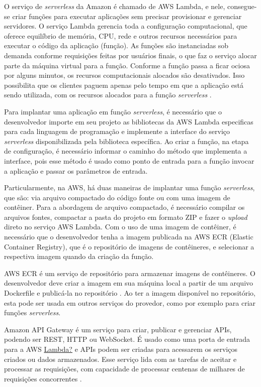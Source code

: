\documentclass[conference]{IEEEtran}
\begin{document}
O serviço de \textit{serverless} da Amazon é chamado de AWS Lambda, e nele, consegue-se criar funções para executar aplicações sem precisar provisionar e gerenciar servidores. 
O serviço Lambda gerencia toda a configuração computacional, que oferece equilíbrio de memória, CPU, rede e outros recursos necessários para executar o código da aplicação (função).
As funções são instanciadas sob demanda conforme requisições feitas por usuários finais, o que faz o serviço alocar parte da máquina virtual para a função. Conforme a função passa a ficar ociosa por alguns minutos, os recursos computacionais alocados são desativados. Isso possibilita que os clientes paguem apenas pelo tempo em que a aplicação está sendo utilizada, com os recursos alocados para a função \textit{serverless} \cite{aws_2023_what_is_lambda}.

Para implantar uma aplicação em função \textit{serverless}, é necessário que o desenvolvedor importe em seu projeto as bibliotecas da AWS Lambda especificas para cada linguagem de programação e implemente a interface do serviço \textit{serverless} disponibilizada pela biblioteca específica. Ao criar a função, na etapa de configuração, é necessário informar o caminho do método que implementa a interface, pois esse método é usado como ponto de entrada para a função invocar a aplicação e passar os parâmetros de entrada.

Particularmente, na AWS, há duas maneiras de implantar uma função \textit{serverless}, que são: via arquivo compactado do código fonte ou com uma imagem de contêiner. Para a abordagem de arquivo compactado, é necessário compilar os arquivos fontes, compactar a pasta do projeto em formato ZIP e fazer o \textit{upload} direto no serviço AWS Lambda. Com o uso de uma imagem de contêiner, é necessário que o desenvolvedor tenha a imagem publicada na AWS ECR (Elastic Container Registry), que é o repositório de imagens de contêineres, e selecionar a respectiva imagem quando da criação da função.

AWS ECR é um serviço de repositório para armazenar imagens de contêineres. O desenvolvedor deve criar a imagem em sua máquina local a partir de um arquivo Dockerfile e publicá-la no repositório \cite{aws_2023_aws_ecr}. Ao ter a imagem disponível no repositório, esta pode ser usada em outros serviços do provedor, como por exemplo para criar funções \textit{serverless}.

Amazon API Gateway é um serviço para criar, publicar e gerenciar APIs, podendo ser REST, HTTP ou WebSocket. É usado como uma porta de entrada para a AWS \ul{Lambda?} e APIs podem ser criadas para acessarem os serviços criados ou dados armazenados. Esse serviço lida com as tarefas de aceitar e processar as requisições, com capacidade de processar centenas de milhares de requisições concorrentes \cite{aws_2023_what_is_api_gateway}. 
\end{document}
